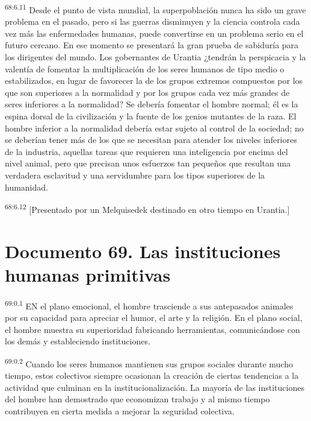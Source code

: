 \documentclass[twoside, 11pt]{book}
\begin{document}
\par
\textsuperscript{68:6.11} Desde el punto de vista mundial, la superpoblación nunca ha sido un grave problema en el pasado, pero si las guerras disminuyen y la ciencia controla cada vez más las enfermedades humanas, puede convertirse en un problema serio en el futuro cercano. En ese momento se presentará la gran prueba de sabiduría para los dirigentes del mundo. Los gobernantes de Urantia ¿tendrán la perspicacia y la valentía de fomentar la multiplicación de los seres humanos de tipo medio o estabilizados, en lugar de favorecer la de los grupos extremos compuestos por los que son superiores a la normalidad y por los grupos cada vez más grandes de seres inferiores a la normalidad? Se debería fomentar el hombre normal; él es la espina dorsal de la civilización y la fuente de los genios mutantes de la raza. El hombre inferior a la normalidad debería estar sujeto al control de la sociedad; no se deberían tener más de los que se necesitan para atender los niveles inferiores de la industria, aquellas tareas que requieren una inteligencia por encima del nivel animal, pero que precisan unos esfuerzos tan pequeños que resultan una verdadera esclavitud y una servidumbre para los tipos superiores de la humanidad.

\par
\textsuperscript{68:6.12} [Presentado por un Melquisedek destinado en otro tiempo en Urantia.]


\chapter{Documento 69. Las instituciones humanas primitivas}
\par
\textsuperscript{69:0.1} EN el plano emocional, el hombre trasciende a sus antepasados animales por su capacidad para apreciar el humor, el arte y la religión. En el plano social, el hombre muestra su superioridad fabricando herramientas, comunicándose con los demás y estableciendo instituciones.

\par
\textsuperscript{69:0.2} Cuando los seres humanos mantienen sus grupos sociales durante mucho tiempo, estos colectivos siempre ocasionan la creación de ciertas tendencias a la actividad que culminan en la institucionalización. La mayoría de las instituciones del hombre han demostrado que economizan trabajo y al mismo tiempo contribuyen en cierta medida a mejorar la seguridad colectiva.
\end{document}
